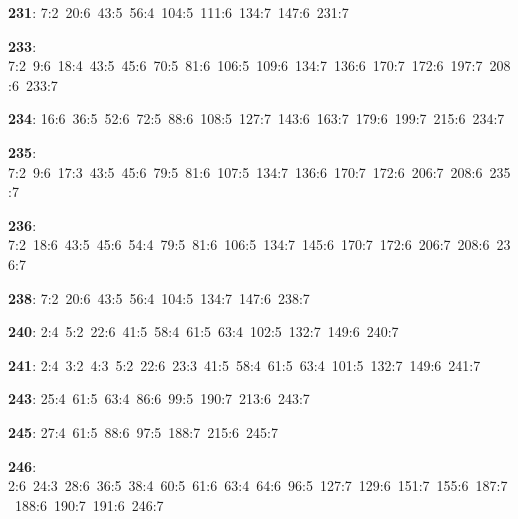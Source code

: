 \noindent \textbf{231}: 7:2\allowbreak\ 20:6\allowbreak\ 43:5\allowbreak\ 56:4\allowbreak\ 104:5\allowbreak\ 111:6\allowbreak\ 134:7\allowbreak\ 147:6\allowbreak\ 231:7\par
\noindent \textbf{233}: 7:2\allowbreak\ 9:6\allowbreak\ 18:4\allowbreak\ 43:5\allowbreak\ 45:6\allowbreak\ 70:5\allowbreak\ 81:6\allowbreak\ 106:5\allowbreak\ 109:6\allowbreak\ 134:7\allowbreak\ 136:6\allowbreak\ 170:7\allowbreak\ 172:6\allowbreak\ 197:7\allowbreak\ 208:6\allowbreak\ 233:7\par
\noindent \textbf{234}: 16:6\allowbreak\ 36:5\allowbreak\ 52:6\allowbreak\ 72:5\allowbreak\ 88:6\allowbreak\ 108:5\allowbreak\ 127:7\allowbreak\ 143:6\allowbreak\ 163:7\allowbreak\ 179:6\allowbreak\ 199:7\allowbreak\ 215:6\allowbreak\ 234:7\par
\noindent \textbf{235}: 7:2\allowbreak\ 9:6\allowbreak\ 17:3\allowbreak\ 43:5\allowbreak\ 45:6\allowbreak\ 79:5\allowbreak\ 81:6\allowbreak\ 107:5\allowbreak\ 134:7\allowbreak\ 136:6\allowbreak\ 170:7\allowbreak\ 172:6\allowbreak\ 206:7\allowbreak\ 208:6\allowbreak\ 235:7\par
\noindent \textbf{236}: 7:2\allowbreak\ 18:6\allowbreak\ 43:5\allowbreak\ 45:6\allowbreak\ 54:4\allowbreak\ 79:5\allowbreak\ 81:6\allowbreak\ 106:5\allowbreak\ 134:7\allowbreak\ 145:6\allowbreak\ 170:7\allowbreak\ 172:6\allowbreak\ 206:7\allowbreak\ 208:6\allowbreak\ 236:7\par
\noindent \textbf{238}: 7:2\allowbreak\ 20:6\allowbreak\ 43:5\allowbreak\ 56:4\allowbreak\ 104:5\allowbreak\ 134:7\allowbreak\ 147:6\allowbreak\ 238:7\par
\noindent \textbf{240}: 2:4\allowbreak\ 5:2\allowbreak\ 22:6\allowbreak\ 41:5\allowbreak\ 58:4\allowbreak\ 61:5\allowbreak\ 63:4\allowbreak\ 102:5\allowbreak\ 132:7\allowbreak\ 149:6\allowbreak\ 240:7\par
\noindent \textbf{241}: 2:4\allowbreak\ 3:2\allowbreak\ 4:3\allowbreak\ 5:2\allowbreak\ 22:6\allowbreak\ 23:3\allowbreak\ 41:5\allowbreak\ 58:4\allowbreak\ 61:5\allowbreak\ 63:4\allowbreak\ 101:5\allowbreak\ 132:7\allowbreak\ 149:6\allowbreak\ 241:7\par
\noindent \textbf{243}: 25:4\allowbreak\ 61:5\allowbreak\ 63:4\allowbreak\ 86:6\allowbreak\ 99:5\allowbreak\ 190:7\allowbreak\ 213:6\allowbreak\ 243:7\par
\noindent \textbf{245}: 27:4\allowbreak\ 61:5\allowbreak\ 88:6\allowbreak\ 97:5\allowbreak\ 188:7\allowbreak\ 215:6\allowbreak\ 245:7\par
\noindent \textbf{246}: 2:6\allowbreak\ 24:3\allowbreak\ 28:6\allowbreak\ 36:5\allowbreak\ 38:4\allowbreak\ 60:5\allowbreak\ 61:6\allowbreak\ 63:4\allowbreak\ 64:6\allowbreak\ 96:5\allowbreak\ 127:7\allowbreak\ 129:6\allowbreak\ 151:7\allowbreak\ 155:6\allowbreak\ 187:7\allowbreak\ 188:6\allowbreak\ 190:7\allowbreak\ 191:6\allowbreak\ 246:7\par
